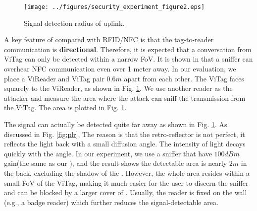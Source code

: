 \begin{figure}[!ht]
\centering
\texttt{[image: ../figures/security\_experiment\_figure2.eps]}
\vskip -0.05in
\caption{Signal detection radius of uplink. }\label{fig:security}
\vskip -0.05in
\end{figure}

A key feature of \retro compared with RFID/NFC is that the tag-to-reader communication is \textbf{directional}. Therefore, it is expected that a conversation from ViTag can only be detected within a narrow FoV. It is shown in \cite{eavesdrop2} that a sniffer can overhear NFC communication even over 1 meter away. In our evaluation, we place a ViReader and ViTag pair $0.6m$ apart from each other. The ViTag faces squarely to the ViReader, as shown in Fig. \ref{fig:security}. We use another reader as the attacker and measure the area where the attack can sniff the transmission from the ViTag. The area is plotted in Fig. \ref{fig:security}. 


The signal can actually be detected quite far away as shown in Fig. \ref{fig:security}. As discussed in Fig. \ref{fig:plr}, 
The reason is that the retro-reflector is not perfect, it reflects the light back with a small diffusion angle. The intensity of light decays quickly with the angle. In our experiment, we use a sniffer that have {$100dBm$} gain(the same as our \reader), and the result shows the detectable area is nearly $2m$ in the back, excluding the shadow of the \reader.
However, the whole area resides within a small FoV of the ViTag, making it much easier for the user to discern the sniffer and can be blocked by a larger cover of \reader. Usually, the reader is fixed on the wall (e.g., a badge reader) which further reduces the signal-detectable area. 


